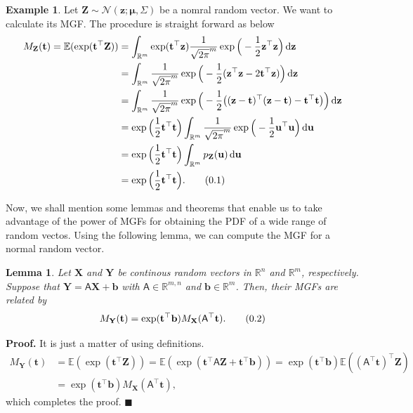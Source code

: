 \documentclass[10pt]{article}
\newtheorem{lem}[thm]{Lemma}
\theoremstyle{definition}
\newtheorem{exmp}{Example}[section]
\newenvironment{prf}{\noindent\textbf{Proof.}}{\hfill$\blacksquare$}
\newcommand\eqnum{\addtocounter{equation}{1}\tag{\arabic{section}.\arabic{equation}}}
\DeclareMathOperator{\df}{d\!}
\begin{document}
\begin{exmp}
Let $\mathbf{Z}\sim\mathcal{N}(\mathbf{z}; \boldsymbol{\mu}, \mathsf{\Sigma})$ be a nomral random vector. We want to calculate its MGF. The procedure is straight forward as below
\begin{align*}
M_{\mathbf{Z}}(\mathbf{t}) = \mathbb{E}(\exp(\mathbf{t}^{\top}\mathbf{Z})) 
&= \int_{\mathbb{R}^m}\exp(\mathbf{t}^{\top}\mathbf{z})\frac{1}{\sqrt{2\pi}^m}\exp\Big(-\frac{1}{2}\mathbf{z}^{\top}\mathbf{z}\Big)\df \mathbf{z} \\
&= \int_{\mathbb{R}^m}\frac{1}{\sqrt{2\pi}^m}\exp\Big(-\frac{1}{2}(\mathbf{z}^{\top}\mathbf{z}-2\mathbf{t}^{\top}\mathbf{z})\Big)\df \mathbf{z} \\
&= \int_{\mathbb{R}^m}\frac{1}{\sqrt{2\pi}^m}\exp\Big(-\frac{1}{2}\big((\mathbf{z}-\mathbf{t})^{\top}(\mathbf{z}-\mathbf{t})-\mathbf{t}^{\top}\mathbf{t}\big)\Big)\df \mathbf{z} \\
&= \exp\Big(\frac{1}{2}\mathbf{t}^{\top}\mathbf{t}\Big)\int_{\mathbb{R}^m}\frac{1}{\sqrt{2\pi}^m}\exp\Big(-\frac{1}{2}\mathbf{u}^{\top}\mathbf{u}\Big)\df \mathbf{u} \\
&= \exp\Big(\frac{1}{2}\mathbf{t}^{\top}\mathbf{t}\Big)\int_{\mathbb{R}^m}p_{\mathbf{Z}}(\mathbf{u})\df \mathbf{u} \\
&= \exp\Big(\frac{1}{2}\mathbf{t}^{\top}\mathbf{t}\Big).
\eqnum
\label{eq:MGF:SN}
\end{align*}
\end{exmp}
Now, we shall mention some lemmas and theorems that enable us to take advantage of the power of MGFs for obtaining the PDF of a wide range of random vectos. Using the following lemma, we can compute the MGF for a normal random vector. 
\begin{lem}
Let $\mathbf{X}$ and $\mathbf{Y}$ be continous random vectors in $\mathbb{R}^n$ and  $\mathbb{R}^m$, respectively. Suppose that $\mathbf{Y} = \mathsf{A} \mathbf{X} + \mathbf{b} $ with $\mathsf{A}\in\mathbb{R}^{m,n}$ and $\mathbf{b}\in\mathbb{R}^m$. Then, their MGFs are related by
\begin{equation*}
M_{\mathbf{Y}}(\mathbf{t}) = \exp(\mathbf{t}^{\top}\mathbf{b}) M_{\mathbf{X}}(\mathsf{A}^{\top}\mathbf{t}).
\eqnum
\label{eq:MGF:lin}
\end{equation*}
\end{lem}
\begin{prf}
It is just a matter of using definitions.
\begin{align*}
M_{\mathbf{Y}}(\mathbf{t}) &= \mathbb{E}(\exp(\mathbf{t}^{\top}\mathbf{Z}))
= \mathbb{E}(\exp(\mathbf{t}^{\top}\mathsf{A}\mathbf{Z}+\mathbf{t}^{\top}\mathbf{b}))
=\exp(\mathbf{t}^{\top}\mathbf{b})\mathbb{E}((\mathsf{A}^{\top}\mathbf{t})^{\top}\mathbf{Z}) \\
&= \exp(\mathbf{t}^{\top}\mathbf{b})M_{\mathbf{X}}(\mathsf{A}^{\top}\mathbf{t}),
\end{align*}
which completes the proof.
\end{prf}
\end{document}
